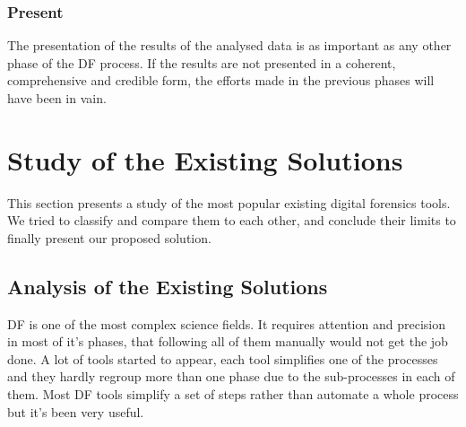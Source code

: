 \subsubsection{Present}
The presentation of the results of the analysed data is as important as any other phase of the DF process. If the results are not presented in a coherent, comprehensive and credible form, the efforts made in the previous phases will have been in vain.


\section{Study of the Existing Solutions}
This section presents a study of the most popular existing digital forensics tools. We tried to classify and compare them to each other, and conclude their limits to finally present our proposed solution.
\subsection{Analysis of the Existing Solutions}
DF is one of the most complex science fields. It requires attention and precision in most of it's phases, that following all of them manually would not get the job done. A lot of tools started to appear, each tool simplifies one of the processes and they hardly regroup more than one phase due to the sub-processes in each of them. Most DF tools simplify a set of steps rather than automate a whole process but it's been very useful.
